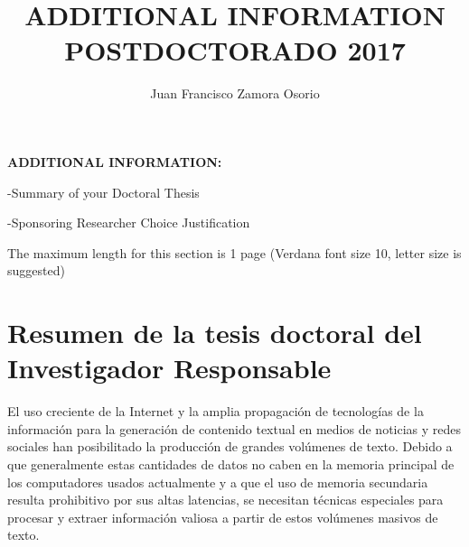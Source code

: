 \documentclass[10pt]{article}
\author{Juan Francisco Zamora Osorio}
\title{ADDITIONAL INFORMATION POSTDOCTORADO 2017}
\begin{document}
\textbf{{\large ADDITIONAL INFORMATION:}}

-Summary of your Doctoral Thesis

-Sponsoring Researcher Choice Justification

The maximum length for this section is 1 page (Verdana font size 10, letter size
is suggested)

\section{Resumen de la tesis doctoral del Investigador Responsable}
El uso creciente de la Internet y la amplia propagación de tecnologías de la información para la generación de contenido textual en medios de noticias y redes sociales han posibilitado la producción de grandes volúmenes de texto. Debido a que generalmente estas cantidades de datos no caben en la memoria principal de los computadores usados actualmente y a que el uso de memoria secundaria resulta prohibitivo por sus altas latencias, se necesitan técnicas especiales para procesar y extraer información valiosa a partir de estos volúmenes masivos de texto.
\end{document}
